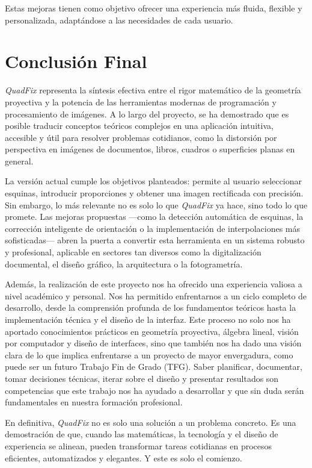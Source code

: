 Estas mejoras tienen como objetivo ofrecer una experiencia más fluida, flexible y personalizada, adaptándose a las necesidades de cada usuario.

\section{Conclusión Final}

\textit{QuadFix} representa la síntesis efectiva entre el rigor matemático de la geometría proyectiva y la potencia de las herramientas modernas de programación y procesamiento de imágenes. A lo largo del proyecto, se ha demostrado que es posible traducir conceptos teóricos complejos en una aplicación intuitiva, accesible y útil para resolver problemas cotidianos, como la distorsión por perspectiva en imágenes de documentos, libros, cuadros o superficies planas en general.

La versión actual cumple los objetivos planteados: permite al usuario seleccionar esquinas, introducir proporciones y obtener una imagen rectificada con precisión. Sin embargo, lo más relevante no es solo lo que \textit{QuadFix} ya hace, sino todo lo que promete. Las mejoras propuestas —como la detección automática de esquinas, la corrección inteligente de orientación o la implementación de interpolaciones más sofisticadas— abren la puerta a convertir esta herramienta en un sistema robusto y profesional, aplicable en sectores tan diversos como la digitalización documental, el diseño gráfico, la arquitectura o la fotogrametría.

Además, la realización de este proyecto nos ha ofrecido una experiencia valiosa a nivel académico y personal. Nos ha permitido enfrentarnos a un ciclo completo de desarrollo, desde la comprensión profunda de los fundamentos teóricos hasta la implementación técnica y el diseño de la interfaz. Este proceso no solo nos ha aportado conocimientos prácticos en geometría proyectiva, álgebra lineal, visión por computador y diseño de interfaces, sino que también nos ha dado una visión clara de lo que implica enfrentarse a un proyecto de mayor envergadura, como puede ser un futuro Trabajo Fin de Grado (TFG). Saber planificar, documentar, tomar decisiones técnicas, iterar sobre el diseño y presentar resultados son competencias que este trabajo nos ha ayudado a desarrollar y que sin duda serán fundamentales en nuestra formación profesional.

En definitiva, \textit{QuadFix} no es solo una solución a un problema concreto. Es una demostración de que, cuando las matemáticas, la tecnología y el diseño de experiencia se alinean, pueden transformar tareas cotidianas en procesos eficientes, automatizados y elegantes. Y este es solo el comienzo.
